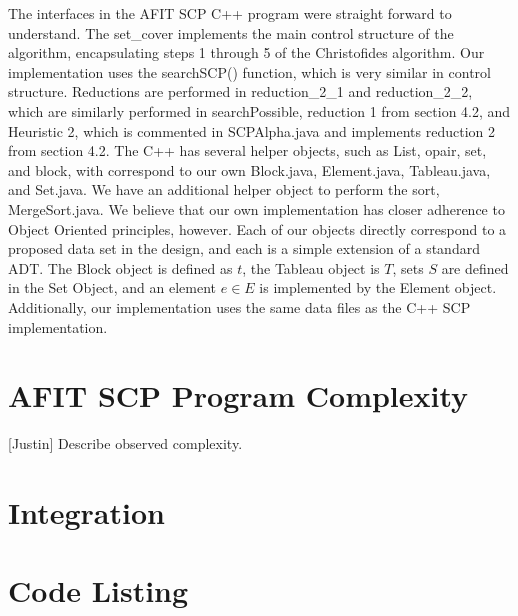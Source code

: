 \documentclass[12pt]{article}
\begin{document}
	The interfaces in the AFIT SCP C++ program were straight forward to understand. The set\_cover implements the main control structure of the algorithm, encapsulating steps 1 through 5 of the Christofides algorithm. Our implementation uses the searchSCP() function, which is very similar in control structure. Reductions are performed in reduction\_2\_1 and reduction\_2\_2, which are similarly performed in searchPossible, reduction 1 from section 4.2, and Heuristic 2, which is commented in SCPAlpha.java and implements reduction 2 from section 4.2. The C++ has several helper objects, such as List, opair, set, and block, with correspond to our own Block.java, Element.java, Tableau.java, and Set.java. We have an additional helper object to perform the sort, MergeSort.java. We believe that our own implementation has closer adherence to Object Oriented principles, however. Each of our objects directly correspond to a proposed data set in the design, and each is a simple extension of a standard ADT. The Block object is defined as $t$, the Tableau object is $T$, sets $S$ are defined in the Set Object, and an element $e \in E$ is implemented by the Element object. Additionally, our implementation uses the same data files as the C++ SCP implementation.
	
	
	\section{AFIT SCP Program Complexity} \label{scn:design}
	
	[Justin] Describe observed complexity.
	
	\section{Integration} \label{scn:design}
	
	
	
	\pagebreak
	\appendix		%
	
	\section{Code Listing}
	
	
	
	
	
	
	
	
	
	
	
\end{document}
